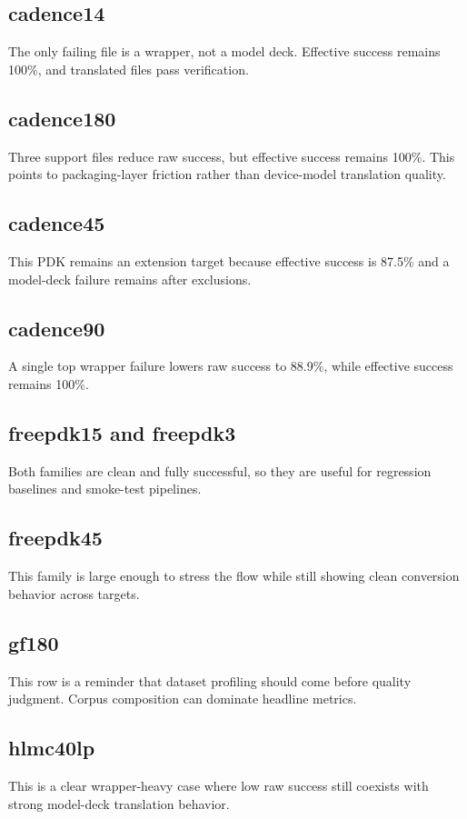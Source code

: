 \documentclass[12pt,a4paper,oneside]{report}
\begin{document}
\subsection{cadence14}
The only failing file is a wrapper, not a model deck. Effective success remains 100\%, and translated files pass verification.

\subsection{cadence180}
Three support files reduce raw success, but effective success remains 100\%. This points to packaging-layer friction rather than device-model translation quality.

\subsection{cadence45}
This PDK remains an extension target because effective success is 87.5\% and a model-deck failure remains after exclusions.

\subsection{cadence90}
A single top wrapper failure lowers raw success to 88.9\%, while effective success remains 100\%.

\subsection{freepdk15 and freepdk3}
Both families are clean and fully successful, so they are useful for regression baselines and smoke-test pipelines.

\subsection{freepdk45}
This family is large enough to stress the flow while still showing clean conversion behavior across targets.

\subsection{gf180}
This row is a reminder that dataset profiling should come before quality judgment. Corpus composition can dominate headline metrics.

\subsection{hlmc40lp}
This is a clear wrapper-heavy case where low raw success still coexists with strong model-deck translation behavior.
\end{document}
